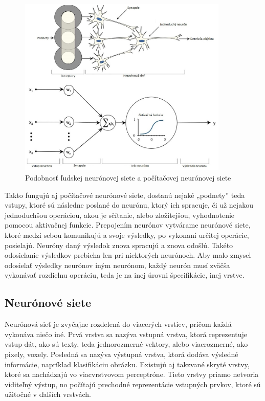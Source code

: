 \begin{figure}[h!]
\begin{centering}
\includegraphics[width=10cm]{assets/images/231_1.JPG}
\par\end{centering}
\caption[font=small]{Podobnosť ľudskej neurónovej siete a počítačovej neurónovej siete \label{fig:dynabook}\cite{Goodfellow-et-al-2016}}
\end{figure}

\hspace{10mm}Takto fungujú aj počítačové neurónové siete, dostanú nejaké „podnety” teda vstupy, ktoré sú následne poslané do neurónu, ktorý ich spracuje, či už nejakou jednoduchšou operáciou, akou  je sčítanie, alebo zložitejšou, vyhodnotenie pomocou aktivačnej funkcie.  Prepojením neurónov vytvárame neurónové siete, ktoré medzi sebou komunikujú a svoje výsledky, po vykonaní určitej operácie,  posielajú. Neuróny daný výsledok znova spracujú a znova odošlú. Takéto odosielanie výsledkov prebieha len pri niektorých neurónoch. Aby malo zmysel odosielať výsledky neurónov iným neurónom, každý neurón musí zväčša vykonávať rozdielnu operáciu, teda je na inej úrovni špecifikácie, inej vrstve.  \cite{Goodfellow-et-al-2016}  

\subsection{Neurónové siete}

\hspace{10mm}Neurónová sieť je zvyčajne rozdelená do viacerých vrstiev, pričom každá vykonáva niečo iné. 
\hspace{10mm}Prvá vrstva sa nazýva vstupná vrstva, ktorá reprezentuje vstup dát, ako sú texty, teda jednorozmerné vektory, alebo viacrozmerné, ako pixely, voxely. Posledná sa nazýva výstupná vrstva, ktorá dodáva výsledné informácie, napríklad klasifikáciu obrázku. Existujú aj takzvané skryté vrstvy, ktoré sa nachádzajú vo viacvrstvovom perceptróne. Tieto vrstvy priamo netvoria viditeľný výstup, no počítajú prechodné reprezentácie vstupných prvkov, ktoré sú užitočné v ďalších vrstvách.\cite{Goodfellow-et-al-2016} 

